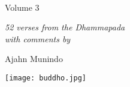 
\cleartorecto
\thispagestyle{empty}

\vspace*{1em}

{\centering

\\[0.4\baselineskip]
Volume 3
\vspace*{3\baselineskip}

{\itshape 52 verses from the Dhammapada\\
with comments by}

\vspace*{2\baselineskip}
Ajahn Munindo

\vfill

\texttt{[image: buddho.jpg]}
\vspace*{1.3em}


}
